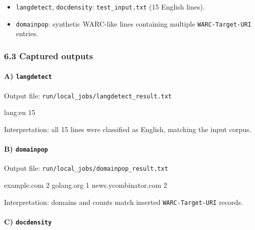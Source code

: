 \documentclass[
]{article}
\newenvironment{Shaded}{}{}
\newcommand{\NormalTok}[1]{#1}
\providecommand{\tightlist}{%
  \setlength{\itemsep}{0pt}\setlength{\parskip}{0pt}}
\begin{document}
\begin{itemize}
\tightlist
\item
  \texttt{langdetect}, \texttt{docdensity}: \texttt{test\_input.txt} (15
  English lines).
\item
  \texttt{domainpop}: synthetic WARC-like lines containing multiple
  \texttt{WARC-Target-URI} entries.
\end{itemize}

\subsubsection{6.3 Captured outputs}\label{captured-outputs}

\paragraph{\texorpdfstring{A)
\texttt{langdetect}}{A) langdetect}}\label{a-langdetect}

Output file: \texttt{run/local\_jobs/langdetect\_result.txt}

\begin{Shaded}
\begin{Highlighting}[]
\NormalTok{lang:en 15}
\end{Highlighting}
\end{Shaded}

Interpretation: all 15 lines were classified as English, matching the
input corpus.

\paragraph{\texorpdfstring{B)
\texttt{domainpop}}{B) domainpop}}\label{b-domainpop}

Output file: \texttt{run/local\_jobs/domainpop\_result.txt}

\begin{Shaded}
\begin{Highlighting}[]
\NormalTok{example.com 2}
\NormalTok{golang.org  1}
\NormalTok{news.ycombinator.com    2}
\end{Highlighting}
\end{Shaded}

Interpretation: domains and counts match inserted
\texttt{WARC-Target-URI} records.

\paragraph{\texorpdfstring{C)
\texttt{docdensity}}{C) docdensity}}\label{c-docdensity}
\end{document}
